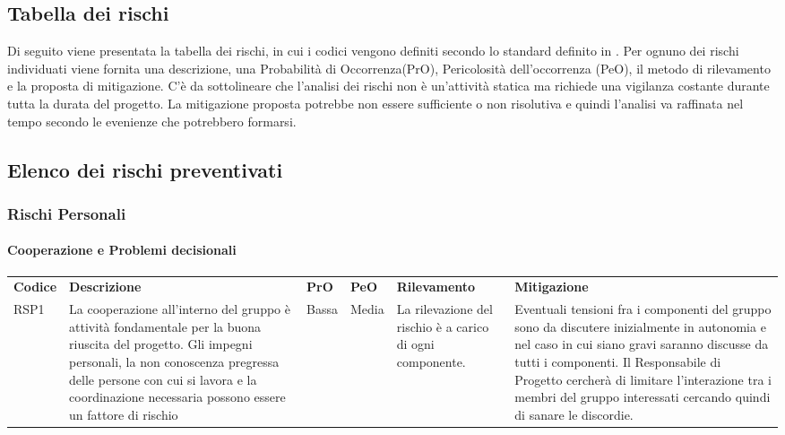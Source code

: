 \subsection{Tabella dei rischi}
Di seguito viene presentata la tabella dei rischi, in cui i codici vengono definiti secondo lo standard definito in .
Per ognuno dei rischi individuati viene fornita una descrizione, una Probabilità di Occorrenza(PrO), Pericolosità dell'occorrenza (PeO), il metodo di rilevamento e la proposta di mitigazione. C'è da sottolineare che l'analisi dei rischi non è un'attività statica ma richiede una vigilanza costante durante tutta la durata del progetto. La mitigazione proposta potrebbe non essere sufficiente o non risolutiva e quindi l'analisi va raffinata nel tempo secondo le evenienze che potrebbero formarsi.

\newpage
		
\subsection{Elenco dei rischi preventivati}

\subsubsection{Rischi Personali}
\paragraph{Cooperazione e Problemi decisionali}
\begin{center}
	\begin{longtable}{p{1cm}|p{4cm}|p{0.7cm}|p{0.7cm}|p{3cm}|p{4cm}}
		\arrayrulecolor{lightest-grayest}
		\rowcolor{blue!20}
		\textbf{Codice} & 
		\textbf{Descrizione} &
		\textbf{PrO}  &
		\textbf{PeO}  &				        
		\textbf{Rilevamento} &
		\textbf{Mitigazione} \\	
		RSP1 & La cooperazione all'interno del gruppo è attività fondamentale per la buona riuscita del progetto. Gli impegni personali, la non conoscenza pregressa delle persone con cui si lavora e la coordinazione necessaria possono essere un fattore di rischio & Bassa & Media & La rilevazione del rischio è a carico di ogni componente. & Eventuali tensioni fra i componenti del gruppo sono da discutere inizialmente in autonomia e nel caso in cui siano gravi saranno discusse da tutti i componenti. Il Responsabile di Progetto cercherà di limitare l'interazione tra i membri del gruppo interessati cercando quindi di sanare le discordie. \\
		\end{longtable}
\end{center}

